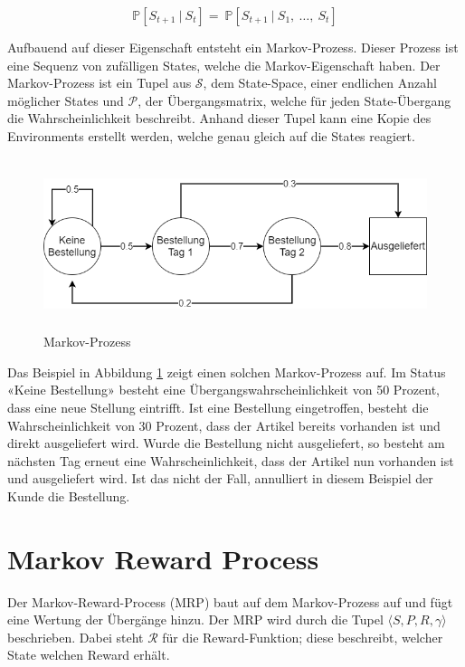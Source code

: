 \begin{equation}
\mathbb{P}[S_{t+1}\ |\ S_t]=\ \mathbb{P}[S_{t+1}\ |\ S_1,\ \ldots,\ S_t]
\end{equation}

Aufbauend auf dieser Eigenschaft entsteht ein Markov-Prozess. Dieser Prozess ist eine Sequenz von zufälligen States, welche die Markov-Eigenschaft haben. Der Markov-Prozess ist ein Tupel aus $\mathcal{S}$, dem State-Space, einer endlichen Anzahl möglicher States und $\mathcal{P}$, der Übergangsmatrix, welche für jeden State-Übergang die Wahrscheinlichkeit beschreibt. Anhand dieser Tupel kann eine Kopie des Environments erstellt werden, welche genau gleich auf die States reagiert.


 \begin{figure}[ht]
 \centering
  \includegraphics[height=5cm]{img/Markov_Prozess_Ext.png}
  \caption{Markov-Prozess}
  \label{mp_draw}
\end{figure}


Das Beispiel in Abbildung \ref{mp_draw} zeigt einen solchen Markov-Prozess auf. Im Status «Keine Bestellung» besteht eine Übergangswahrscheinlichkeit von 50 Prozent, dass eine neue Stellung eintrifft. Ist eine Bestellung eingetroffen, besteht die Wahrscheinlichkeit von 30 Prozent, dass der Artikel bereits vorhanden ist und direkt ausgeliefert wird. Wurde die Bestellung nicht ausgeliefert, so besteht am nächsten Tag erneut eine Wahrscheinlichkeit, dass der Artikel nun vorhanden ist und ausgeliefert wird. Ist das nicht der Fall, annulliert in diesem Beispiel der Kunde die Bestellung.

\section{Markov Reward Process}
Der Markov-Reward-Process (MRP) baut auf dem Markov-Prozess auf und fügt eine Wertung der Übergänge hinzu. Der MRP wird durch die Tupel $\langle S,P,R,\gamma \rangle$ beschrieben. Dabei steht $\mathcal{R}$ für die Reward-Funktion; diese beschreibt, welcher State welchen Reward erhält. 

